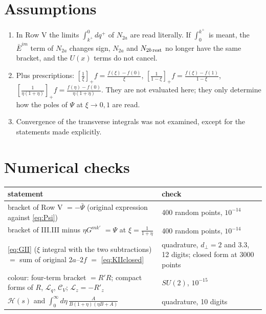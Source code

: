 \documentclass[10pt]{article}
\numberwithin{equation}{section}
\begin{document}
\section{Assumptions}
\begin{enumerate}
\item In Row V the limits $\int^{0}_{k^{+}}dq^{+}$ of $N_{2a}$ are read literally. If $\int_{0}^{k^{+}}$ is meant, the $\bar E^{im}$ term of $N_{2a}$ changes sign, $N_{2a}$ and $N_{2b\,\rm rest}$ no longer have the same bracket, and the $U(x)$ terms do not cancel.
\item Plus prescriptions: $[\frac1\xi]_{+}f=\frac{f(\xi)-f(0)}{\xi}$, $[\frac{1}{1-\xi}]_{+}f=\frac{f(\xi)-f(1)}{1-\xi}$, $[\frac{1}{\eta(1+\eta)}]_{+}f=\frac{f(\eta)-f(0)}{\eta(1+\eta)}$. They are not evaluated here; they only determine how the poles of $\Psi$ at $\xi\to0,1$ are read.
\item Convergence of the transverse integrals was not examined, except for the statements made explicitly.
\end{enumerate}

\appendix
\section{Numerical checks}
\begin{center}
\renewcommand{\arraystretch}{1.2}
\begin{tabular}{p{9.5cm}|p{7.2cm}}
statement & check\\ \hline
bracket of Row V $=-\bar\Psi$ (original expression against \eqref{eq:Psi}) & 400 random points, $10^{-14}$\\
bracket of III.III minus $\eta G^{mk'}$ $=\Psi$ at $\xi=\frac{1}{1+\eta}$ & 400 random points, $10^{-14}$\\
\eqref{eq:GII} ($\xi$ integral with the two subtractions) $=$ sum of original $2a$--$2f$ $=$ \eqref{eq:KIIclosed} & quadrature, $d_{\perp}=2$ and $3.3$, 12 digits; closed form at 3000 points\\
colour: four-term bracket $=R'R$; compact forms of $R$, $\mathcal{L}_{q}$, $\mathcal{C}_{V}$; $\mathcal{L}_{z}=-R'_{z}$ & $SU(2)$, $10^{-15}$\\
$\mathcal{H}(s)$ and $\int_{0}^{\infty}d\eta\,\frac{A}{B(1+\eta)(\eta B+A)}$ & quadrature, 10 digits
\end{tabular}
\end{center}
\end{document}
